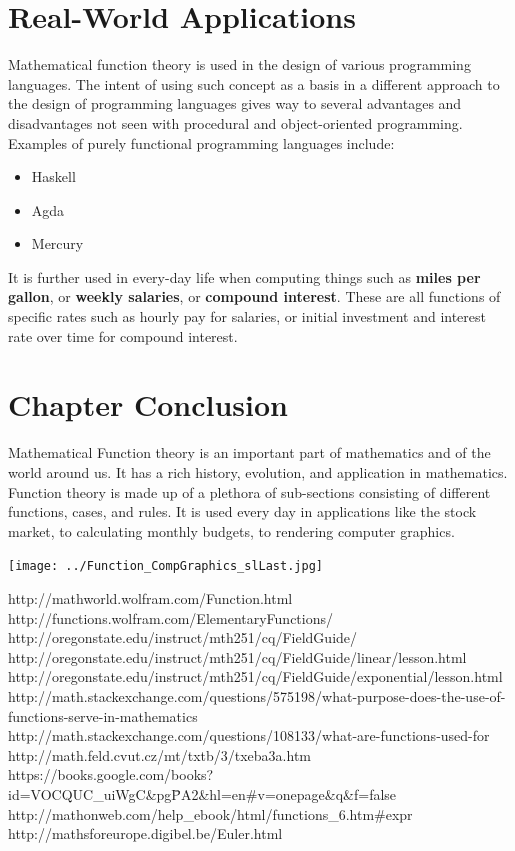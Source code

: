 \documentclass[11pt,oneside]{book}              %
\begin{document}
\section{Real-World Applications}
Mathematical function theory is used in the design of various programming languages. The intent of using such concept as a basis in a different approach to the design of programming languages gives way to several advantages and disadvantages not seen with procedural and object-oriented programming. Examples of purely functional programming languages include:
\begin{itemize}
	\item{Haskell}
	\item{Agda}
	\item{Mercury}
\end{itemize}
It is further used in every-day life when computing things such as \textbf{miles per gallon}, or \textbf{weekly salaries}, or \textbf{compound interest}. These are all functions of specific rates such as hourly pay for salaries, or initial investment and interest rate over time for compound interest.

\section{Chapter Conclusion}
Mathematical Function theory is an important part of mathematics and of the world around us. It has a rich history, evolution, and application in mathematics. Function theory is made up of a plethora of sub-sections consisting of different functions, cases, and rules. It is used every day in applications like the stock market, to calculating monthly budgets, to rendering computer graphics.
\begin{center}\texttt{[image: ../Function\_CompGraphics\_slLast.jpg]} \end{center}

\begin{thebibliography}{10}

 http://mathworld.wolfram.com/Function.html
 http://functions.wolfram.com/ElementaryFunctions/
 http://oregonstate.edu/instruct/mth251/cq/FieldGuide/
 http://oregonstate.edu/instruct/mth251/cq/FieldGuide/linear/lesson.html
 http://oregonstate.edu/instruct/mth251/cq/FieldGuide/exponential/lesson.html
 http://math.stackexchange.com/questions/575198/what-purpose-does-the-use-of-functions-serve-in-mathematics
 http://math.stackexchange.com/questions/108133/what-are-functions-used-for
 http://math.feld.cvut.cz/mt/txtb/3/txeba3a.htm
 https://books.google.com/books?id=VOCQUC\_uiWgC\&pg\=PA2\&hl=en\#v=onepage\&q\&f=false
 http://mathonweb.com/help\_ebook/html/functions\_6.htm\#expr
 http://mathsforeurope.digibel.be/Euler.html

\end{thebibliography}
\end{document}
